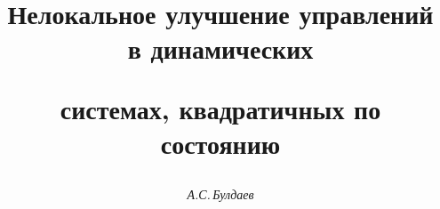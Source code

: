 




%





\newcommand{\la}{\langle}


\newcommand{\ra}{\rangle}


\newcommand{\mes}{\operatorname{mes}}


\newcommand{\argmax}{\operatornamewithlimits{arg~max}}


\renewcommand{\baselinestretch}{0.97}


\newcommand{\tts}[1]{}







\setcounter{page}{3}















\author{\it А.С.\,Булдаев}




\title{Нелокальное улучшение управлений в динамических 


системах, квадратичных по состоянию}





\date{}




\pagestyle{plain} %







